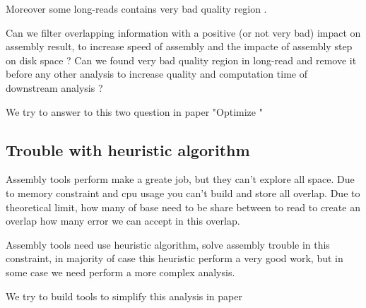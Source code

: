 \documentclass[./main.tex]{subfiles}
\begin{document}
Moreover some long-reads contains very bad quality region \cite{blog_post_error_repartition}.

Can we filter overlapping information with a positive (or not very bad) impact on assembly result, to increase speed of assembly and the impacte of assembly step on disk space ?
Can we found very bad quality region in long-read and remove it before any other analysis to increase quality and computation time of downstream analysis ?

We try to answer to this two question in paper "Optimize "

\subsection{Trouble with heuristic algorithm}

Assembly tools perform make a greate job, but they can't explore all space.
Due to memory constraint and cpu usage you can't build and store all overlap.
Due to theoretical limit, how many of base need to be share between to read to create an overlap how many error we can accept in this overlap.

Assembly tools need use heuristic algorithm, solve assembly trouble in this constraint, in majority of case this heuristic  perform a very good work, but in some case we need perform a more complex analysis.

We try to build tools to simplify this analysis in paper

\end{document}
